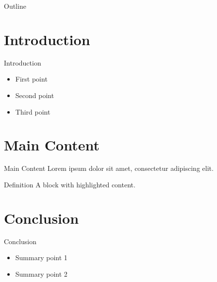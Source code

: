 \begin{frame}
  \titlepage
\end{frame}

\begin{frame}{Outline}
  \tableofcontents
\end{frame}

\section{Introduction}

\begin{frame}{Introduction}
  \begin{itemize}
    \item First point
    \item Second point
    \item Third point
  \end{itemize}
\end{frame}

\section{Main Content}

\begin{frame}{Main Content}
  Lorem ipsum dolor sit amet, consectetur adipiscing elit.
  \begin{block}{Definition}
    A block with highlighted content.
  \end{block}
\end{frame}

\section{Conclusion}

\begin{frame}{Conclusion}
  \begin{itemize}
    \item Summary point 1
    \item Summary point 2
  \end{itemize}
\end{frame}
